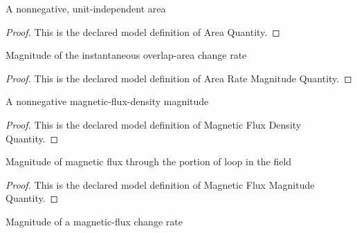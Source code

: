 \begin{definition}
  \label{def:physics:phyx-mini-0931:phyxminiproblems-problemphyxmini0931-areaquantity}
  A nonnegative, unit-independent area
\end{definition}
\begin{proof}
  This is the declared model definition of Area Quantity.
\end{proof}
\begin{definition}
  \label{def:physics:phyx-mini-0931:phyxminiproblems-problemphyxmini0931-arearatemagnitudequantity}
  Magnitude of the instantaneous overlap-area change rate
\end{definition}
\begin{proof}
  This is the declared model definition of Area Rate Magnitude Quantity.
\end{proof}
\begin{definition}
  \label{def:physics:phyx-mini-0931:phyxminiproblems-problemphyxmini0931-magneticfluxdensityquantity}
  A nonnegative magnetic-flux-density magnitude
\end{definition}
\begin{proof}
  This is the declared model definition of Magnetic Flux Density Quantity.
\end{proof}
\begin{definition}
  \label{def:physics:phyx-mini-0931:phyxminiproblems-problemphyxmini0931-magneticfluxmagnitudequantity}
  Magnitude of magnetic flux through the portion of loop in the field
\end{definition}
\begin{proof}
  This is the declared model definition of Magnetic Flux Magnitude Quantity.
\end{proof}
\begin{definition}
  \label{def:physics:phyx-mini-0931:phyxminiproblems-problemphyxmini0931-magneticfluxratemagnitudequantity}
  Magnitude of a magnetic-flux change rate
\end{definition}
